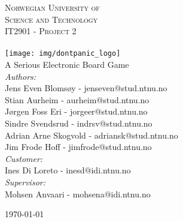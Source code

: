 \begin{center}



\textsc{\LARGE Norwegian University of\\ Science and Technology}\\[1.5cm]

\textsc{\Large IT2901 - Project 2}\\[0.5cm]

\HRule \\[0.4cm]
{%
	\texttt{[image: img/dontpanic\_logo]}\\[0.4cm]}
	A Serious Electronic Board Game
\HRule \\[1.5cm]


	\emph{Authors:}\\
	Jens Even Blomsøy 		- 	jenseven@stud.ntnu.no\\
	Stian Aurheim 		- 	aurheim@stud.ntnu.no\\
	Jørgen Foss Eri 		-	jorgeer@stud.ntnu.no\\
	Sindre Svendsrud 		-	indrsv@stud.ntnu.no\\
	Adrian Arne Skogvold 	- 	adriansk@stud.ntnu.no\\
	Jim Frode Hoff 		- 	jimfrode@stud.ntnu.no\\
	\vspace{10 mm}
	\emph{Customer:} \\
	Ines Di Loreto		- 	inesd@idi.ntnu.no\\
	\vspace{10 mm}
	\emph{Supervisor:} \\
	Mohsen Anvaari		-	mohsena@idi.ntnu.no\\

\vfill

{\large \today}

\end{center}
\pagebreak
